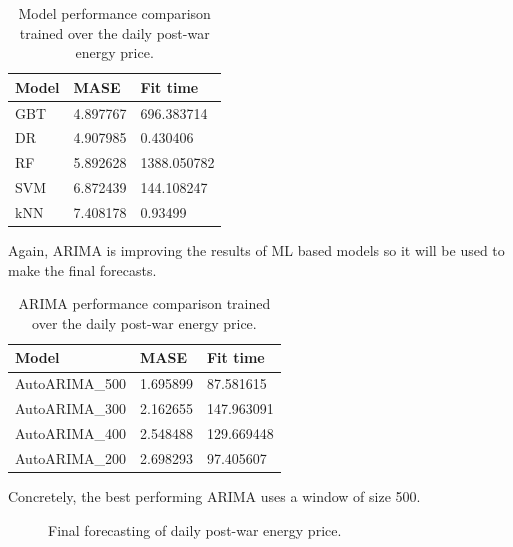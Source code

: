 \begin{table}[H]
\centering
\begin{tabular}{l|l|l}
\hline
Model & MASE     & Fit time    \\ \hline
GBT   & 4.897767 & 696.383714  \\
DR    & 4.907985 & 0.430406    \\
RF    & 5.892628 & 1388.050782 \\
SVM   & 6.872439 & 144.108247  \\
kNN   & 7.408178 & 0.93499     \\ \hline
\end{tabular}
\caption{Model performance comparison trained over the daily post-war energy price.}
\label{tab:cv-daily-post}
\end{table}

Again, ARIMA is improving the results of ML based models so it will be used to make the final forecasts.

\begin{table}[H]
\centering
\begin{tabular}{@{}l|l|l@{}}
\toprule
Model          & MASE     & Fit time   \\ \midrule
AutoARIMA\_500 & 1.695899 & 87.581615  \\
AutoARIMA\_300 & 2.162655 & 147.963091 \\
AutoARIMA\_400 & 2.548488 & 129.669448 \\
AutoARIMA\_200 & 2.698293 & 97.405607  \\ \bottomrule
\end{tabular}
\caption{ARIMA performance comparison trained over the daily post-war energy price.}
\label{tab:arima-daily-post}
\end{table}

Concretely, the best performing ARIMA uses a window of size 500.

\begin{figure}[H]
\centering
    \caption{Final forecasting of daily post-war energy price.}
    \label{fig:forecast-arima-daily-post}
\end{figure}

